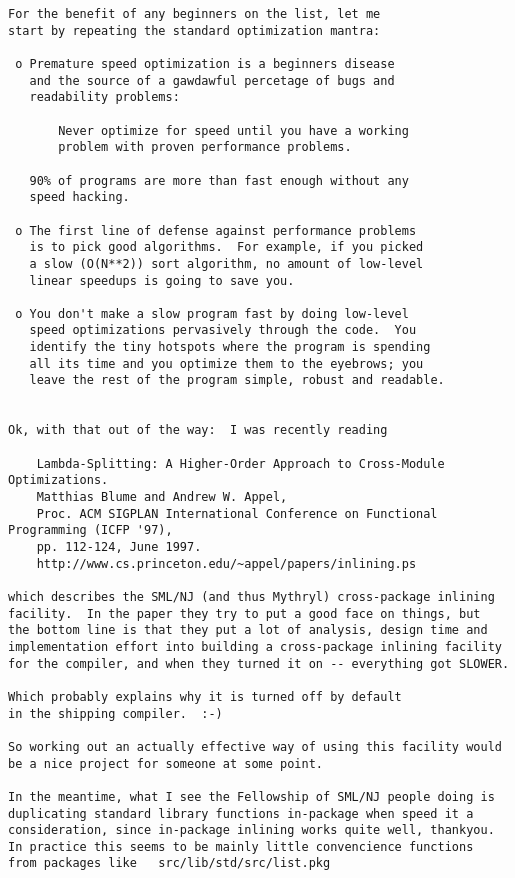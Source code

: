 \begin{verbatim}
For the benefit of any beginners on the list, let me
start by repeating the standard optimization mantra:

 o Premature speed optimization is a beginners disease
   and the source of a gawdawful percetage of bugs and
   readability problems:

       Never optimize for speed until you have a working
       problem with proven performance problems.

   90% of programs are more than fast enough without any
   speed hacking.

 o The first line of defense against performance problems
   is to pick good algorithms.  For example, if you picked
   a slow (O(N**2)) sort algorithm, no amount of low-level
   linear speedups is going to save you.

 o You don't make a slow program fast by doing low-level
   speed optimizations pervasively through the code.  You
   identify the tiny hotspots where the program is spending
   all its time and you optimize them to the eyebrows; you
   leave the rest of the program simple, robust and readable.


Ok, with that out of the way:  I was recently reading

    Lambda-Splitting: A Higher-Order Approach to Cross-Module Optimizations.
    Matthias Blume and Andrew W. Appel,
    Proc. ACM SIGPLAN International Conference on Functional Programming (ICFP '97),
    pp. 112-124, June 1997.
    http://www.cs.princeton.edu/~appel/papers/inlining.ps

which describes the SML/NJ (and thus Mythryl) cross-package inlining
facility.  In the paper they try to put a good face on things, but
the bottom line is that they put a lot of analysis, design time and
implementation effort into building a cross-package inlining facility
for the compiler, and when they turned it on -- everything got SLOWER.

Which probably explains why it is turned off by default
in the shipping compiler.  :-)

So working out an actually effective way of using this facility would
be a nice project for someone at some point.

In the meantime, what I see the Fellowship of SML/NJ people doing is
duplicating standard library functions in-package when speed it a
consideration, since in-package inlining works quite well, thankyou.
In practice this seems to be mainly little convencience functions
from packages like   src/lib/std/src/list.pkg


\end{verbatim}
